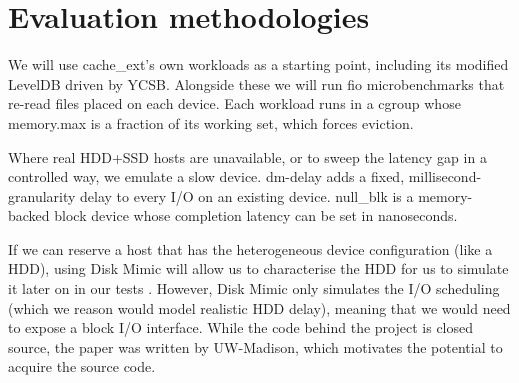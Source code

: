 \documentclass[11pt,sigconf,nonacm]{acmart}
\begin{document}



\section{Evaluation methodologies}


We will use cache\_ext's own workloads as a starting point, including its modified LevelDB driven by YCSB. Alongside these we will run fio microbenchmarks that re-read files placed on each device. Each workload runs in a cgroup whose memory.max is a fraction of its working set, which forces eviction.

Where real HDD+SSD hosts are unavailable, or to sweep the latency gap in a controlled way, we emulate a slow device. dm-delay adds a fixed, millisecond-granularity delay to every I/O on an existing device. null\_blk is a memory-backed block device whose completion latency can be set in nanoseconds.

If we can reserve a host that has the heterogeneous device configuration (like a HDD), using Disk Mimic will allow us to characterise the HDD for us to simulate it later on in our tests \cite{disk_mimic}.
However, Disk Mimic only simulates the I/O scheduling (which we reason would model realistic HDD delay), meaning that we would need to expose a block I/O interface. While the code behind the project is closed source, the paper was written by UW-Madison, which motivates the potential to acquire the source code.
\end{document}
